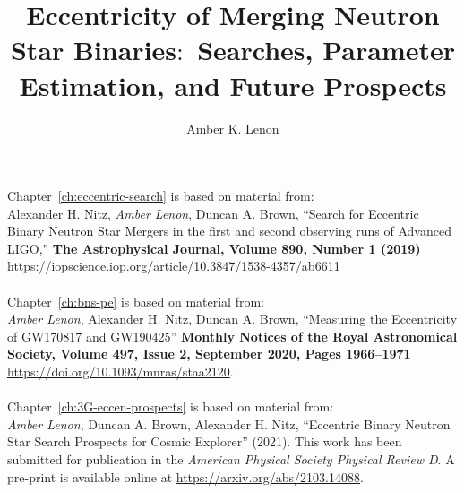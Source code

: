 \documentclass[12pt,notitlepage]{report}
\begin{document}
\title{Eccentricity of Merging Neutron Star Binaries$:$ Searches, Parameter Estimation, and Future Prospects}
\author{Amber K. Lenon}
\clearpage

\havededicationtrue
\dedication{To Mom, Collin, \& Jace}
\haveminorfalse
{}
\copyrighttrue
\doctoratetrue
\figurespagetrue
\tablespagetrue
\electronicsubmittrue
\Acknowledgments{
}
\beforepreface
{}
Chapter~\ref{ch:eccentric-search} is based on material from: \\
Alexander H. Nitz, \textit{Amber Lenon}, Duncan A. Brown, ``Search for Eccentric Binary Neutron Star Mergers in the first and second observing runs of Advanced LIGO,'' \textbf{ The Astrophysical Journal, Volume 890, Number 1 (2019)} \\ \url{https://iopscience.iop.org/article/10.3847/1538-4357/ab6611}
\\ \\
Chapter~\ref{ch:bns-pe} is based on material from:  \\ 
\textit{Amber Lenon}, Alexander H. Nitz, Duncan A. Brown, ``Measuring the Eccentricity of GW170817 and GW190425'' \textbf{Monthly Notices of the Royal Astronomical Society, Volume 497, Issue 2, September 2020, Pages 1966–1971} \\  \url{https://doi.org/10.1093/mnras/staa2120}.
\\ \\
Chapter~\ref{ch:3G-eccen-prospects} is based on material from:  \\ 
\textit{Amber Lenon}, Duncan A. Brown, Alexander H. Nitz,  ``Eccentric Binary Neutron Star Search Prospects for Cosmic Explorer'' (2021).  This work has been submitted for publication in the \textit{American Physical Society Physical Review D}. A pre-print is available online at \url{https://arxiv.org/abs/2103.14088}.
\\ \\
\end{document}

